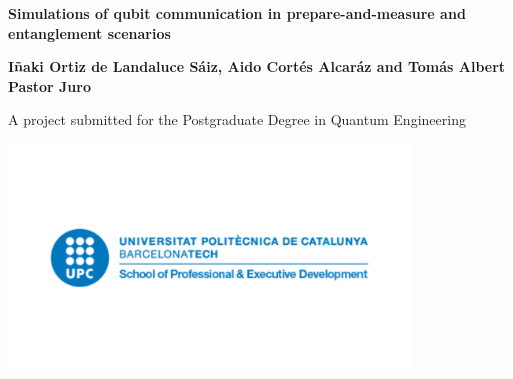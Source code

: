 \begin{titlepage}
   \begin{center}
       \vspace*{1cm}

       \Large
       \textbf{Simulations of qubit communication in prepare-and-measure and entanglement scenarios}

       \vspace{0.8cm}

       \normalsize
       \textbf{I\~{n}aki Ortiz de Landaluce S\'aiz, Aido Cort\'es Alcar\'az and Tom\'as Albert Pastor Juro}

       \vfill
            
       \footnotesize{A project submitted for the Postgraduate Degree in Quantum Engineering}
            
       \includegraphics[width=0.8\textwidth]{images/upc.png}
            
       \date{\today}
            
   \end{center}
\end{titlepage}